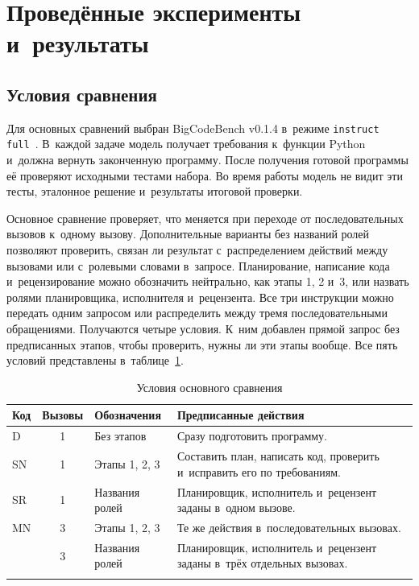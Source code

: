 \section{Проведённые эксперименты и~результаты}\label{sec:eval}
\subsection{Условия сравнения}
Для основных сравнений выбран BigCodeBench v0.1.4 в~режиме \texttt{instruct full}~\cite{zhuo2024bigcodebench}. В~каждой задаче модель получает требования к~функции Python и~должна вернуть законченную программу. После получения готовой программы её проверяют исходными тестами набора. Во время работы модель не видит эти тесты, эталонное решение и~результаты итоговой проверки.

Основное сравнение проверяет, что меняется при переходе от последовательных вызовов к~одному вызову. Дополнительные варианты без названий ролей позволяют проверить, связан ли результат с~распределением действий между вызовами или с~ролевыми словами в~запросе. Планирование, написание кода и~рецензирование можно обозначить нейтрально, как этапы 1, 2 и~3, или назвать ролями планировщика, исполнителя и~рецензента. Все три инструкции можно передать одним запросом или распределить между тремя последовательными обращениями. Получаются четыре условия. К~ним добавлен прямой запрос без предписанных этапов, чтобы проверить, нужны ли эти этапы вообще. Все пять условий представлены в~таблице~\ref{tab:design}.

\begin{table}[htbp]
\caption{Условия основного сравнения}
\label{tab:design}
\centering\small\renewcommand{\arraystretch}{1.18}
\begin{tabularx}{\textwidth}{@{}lc>{\raggedright\arraybackslash}p{2.2cm}>{\raggedright\arraybackslash}X@{}}
\toprule
Код & Вызовы & Обозначения & Предписанные действия \\
\midrule
D & 1 & Без этапов & Сразу подготовить программу. \\
SN & 1 & Этапы 1, 2, 3 & Составить план, написать код, проверить и~исправить его по требованиям. \\
SR & 1 & Названия ролей & Планировщик, исполнитель и~рецензент заданы в~одном вызове. \\
MN & 3 & Этапы 1, 2, 3 & Те же действия в~последовательных вызовах. \\
\MultiCallRole{} & 3 & Названия ролей & Планировщик, исполнитель и~рецензент заданы в~трёх отдельных вызовах. \\
\botrule
\end{tabularx}
\end{table}
\FloatBarrier

